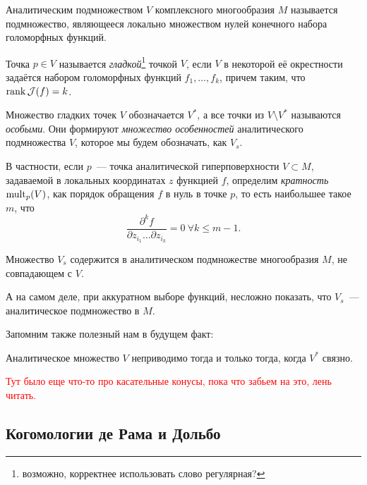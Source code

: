     \begin{definition}
        Аналитическим подмножеством $V$ комплексного многообразия $M$ называется подмножество, являющееся локально множеством нулей конечного набора голоморфных функций.

       Точка $p \in V$ называется \emph{гладкой}\footnote{возможно, корректнее использовать слово регулярная?} точкой $V$, если $V$
        в некоторой её окрестности задаётся набором голоморфных функций $f_{1}, \ldots, f_{k}$, причем таким, что $\operatorname{rank}{\mathcal{J}(f)} = k$.

        Множество гладких точек $V$ обозначается $V^{*}$, а все точки из $V \setminus V^{*}$ называются \emph{особыми}.
        Они формируют \emph{множество особенностей} аналитического подмножества $V$, которое мы будем обозначать, как $V_{s}$.

        В частности, если $p$~--- точка аналитической гиперповерхности $V \subset M$, задаваемой в локальных координатах $z$ функцией $f$, определим \emph{кратность} $\operatorname{mult}_{p}(V)$, как
        порядок обращения $f$  в нуль в точке $p$, то есть наибольшее такое $m$, что
        \[ \frac{\partial^{k}f}{\partial z_{i_{1}} \ldots \partial z_{i_{k}}} = 0 \ \forall k \le m - 1. \]

    \end{definition}
    
    \begin{statement}
        Множество $V_{s}$ содержится в аналитическом подмножестве многообразия $M$, не совпадающем с $V$. 
    \end{statement}
    \begin{remark}
       А на самом деле, при аккуратном выборе функций, несложно показать, что $V_{s}$~--- аналитическое подмножество в $M$.
    \end{remark}   

    Запомним также полезный нам в будущем факт:

    \begin{statement}
        Аналитическое множество $V$ неприводимо тогда и только тогда, когда $V^{*}$ связно.
    \end{statement}

    \textcolor{red}{Тут было еще что-то про касательные конусы, пока что забьем на это, лень читать. }


    \subsection{Когомологии де Рама и Дольбо}

